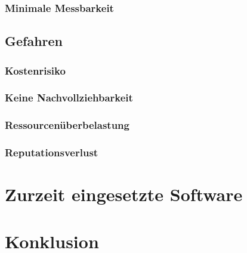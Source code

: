 \subsubsection{Minimale Messbarkeit}
\subsection{Gefahren}
\subsubsection{Kostenrisiko}
\subsubsection{Keine Nachvollziehbarkeit}
\subsubsection{Ressourcenüberbelastung}
\subsubsection{Reputationsverlust}
\section{Zurzeit eingesetzte Software}
\section{Konklusion}